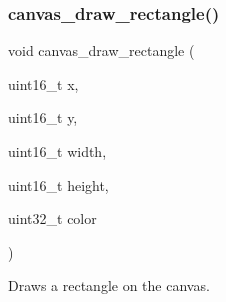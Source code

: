 \subsubsection{\texorpdfstring{canvas\+\_\+draw\+\_\+rectangle()}{canvas\_draw\_rectangle()}}
{\footnotesize\ttfamily void canvas\+\_\+draw\+\_\+rectangle (\begin{DoxyParamCaption}\item[{uint16\+\_\+t}]{x,  }\item[{uint16\+\_\+t}]{y,  }\item[{uint16\+\_\+t}]{width,  }\item[{uint16\+\_\+t}]{height,  }\item[{uint32\+\_\+t}]{color }\end{DoxyParamCaption})}



Draws a rectangle on the canvas. 



